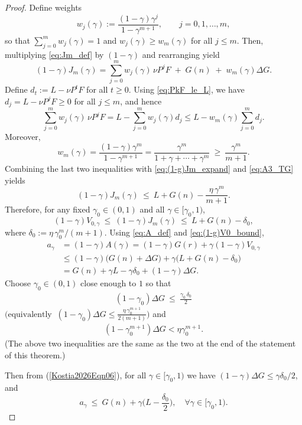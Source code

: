 \documentclass[10pt,a4paper]{amsart}
\begin{document}
\begin{proof}
Define weights
\[
w_j(\gamma):=\frac{(1-\gamma)\gamma^j}{1-\gamma^{m+1}},\qquad j=0,1,\dots,m,
\]
so that $\sum_{j=0}^{m} w_j(\gamma)=1$ and $w_j(\gamma)\ge w_m(\gamma)$ for all $j\le m$.
Then, multiplying \eqref{eq:Jm_def} by $(1-\gamma)$ and rearranging {yield}
\begin{equation}\label{eq:(1-g)Jm_expand}
(1-\gamma)J_m(\gamma)=\sum_{j=0}^m w_j(\gamma)\,\nu P^jF\;+\;G(n)\;+\;w_m(\gamma)\Delta G.
\end{equation}
{Define $d_t := L - \nu P^t F$ for all $t\ge 0$.}
Using \eqref{eq:PkF_le_L}, we have $d_j = L-\nu P^jF\ge 0$ for all $j\le m$, and hence
\[
\sum_{j=0}^m w_j(\gamma)\,\nu P^jF
= L-\sum_{j=0}^m w_j(\gamma)d_j
\le L-w_m(\gamma)\sum_{j=0}^m d_j.
\]
Moreover,
\[
w_m(\gamma)=\frac{(1-\gamma)\gamma^m}{1-\gamma^{m+1}}
=\frac{\gamma^m}{1+\gamma+\cdots+\gamma^m}\ \ge\ \frac{\gamma^m}{m+1}.
\]
Combining the last two inequalities with \eqref{eq:(1-g)Jm_expand} and \eqref{eq:A3_TG} yields
\[
(1-\gamma)J_m(\gamma)\ \le\ L+G(n)-\frac{\eta\,\gamma^m}{m+1}.
\]
Therefore, for any fixed $\gamma_0\in(0,1)$ and all $\gamma\in[\gamma_0,1)$,
\begin{equation}\label{eq:(1-g)V0_bound}
(1-\gamma)V_{0,\gamma}\ \le\ (1-\gamma)J_m(\gamma)\ \le\ L+G(n)-\delta_0,
\end{equation}
where $\delta_0 := \eta\,\gamma_0^{m}/(m+1)$. Using \eqref{eq:A_def} and \eqref{eq:(1-g)V0_bound},
\begin{align}
a_\gamma
&=(1-\gamma){A(\gamma)}=(1-\gamma)G(r)+\gamma(1-\gamma)V_{0,\gamma}\nonumber\\
&\le (1-\gamma)\big(G(n)+\Delta G\big)+\gamma\big(L+G(n)-\delta_0\big)\nonumber\\
&= G(n)+\gamma L-\gamma\delta_0 + (1-\gamma)\Delta G.\nonumber
\end{align}
Choose $\gamma_0\in(0,1)$ close enough to $1$ so that
\begin{align}\label{Kostia2026Eqn06}
(1-\gamma_0)\Delta G\ \le\ \frac{\gamma_0\,\delta_0}{2}
\end{align}
$\Big(\text{equivalently }\
(1-\gamma_0)\Delta G\le \frac{\eta\,\gamma_0^{m+1}}{2(m+1)}\Big)$
and 
\begin{align}\label{Kostia2026Eqn07}
 (1-\gamma_0^{m+1})\Delta G<\eta \gamma_0^{m+1}.
\end{align}
(The above two inequalities are the same as the two at the end of the statement of this theorem.)

Then {from (\ref{Kostia2026Eqn06}),} for all $\gamma\in[\gamma_0,1)$ we have $(1-\gamma)\Delta G\le \gamma\delta_0/2$, and
\begin{equation}\label{eq:a_gamma_bound}
a_\gamma\ \le\ G(n)+\gamma\Big(L-\frac{\delta_0}{2}\Big),
\quad \forall \gamma\in[\gamma_0,1).
\end{equation}


\end{proof}
\end{document}
